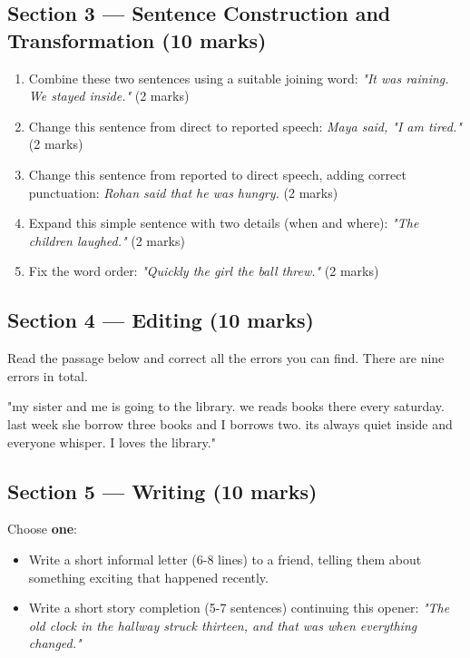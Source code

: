 \subsection*{Section 3 — Sentence Construction and Transformation (10 marks)}
\begin{enumerate}
    \item Combine these two sentences using a suitable joining word: \textit{"It was raining. We stayed inside."} (2 marks)
    \item Change this sentence from direct to reported speech: \textit{Maya said, "I am tired."} (2 marks)
    \item Change this sentence from reported to direct speech, adding correct punctuation: \textit{Rohan said that he was hungry.} (2 marks)
    \item Expand this simple sentence with two details (when and where): \textit{"The children laughed."} (2 marks)
    \item Fix the word order: \textit{"Quickly the girl the ball threw."} (2 marks)
\end{enumerate}

\subsection*{Section 4 — Editing (10 marks)}
Read the passage below and correct all the errors you can find. There are nine errors in total.
\begin{tcolorbox}[colback=gray!5, colframe=gray!50, sharp corners, boxsep=0pt, left=5pt, right=5pt, top=5pt, bottom=5pt, breakable]
"my sister and me is going to the library. we reads books there every saturday. last week she borrow three books and I borrows two. its always quiet inside and everyone whisper. I loves the library."
\end{tcolorbox}

\subsection*{Section 5 — Writing (10 marks)}
Choose \textbf{one}:
\begin{itemize}
    \item Write a short informal letter (6-8 lines) to a friend, telling them about something exciting that happened recently.
    \item Write a short story completion (5-7 sentences) continuing this opener: \textit{"The old clock in the hallway struck thirteen, and that was when everything changed."}
\end{itemize}

